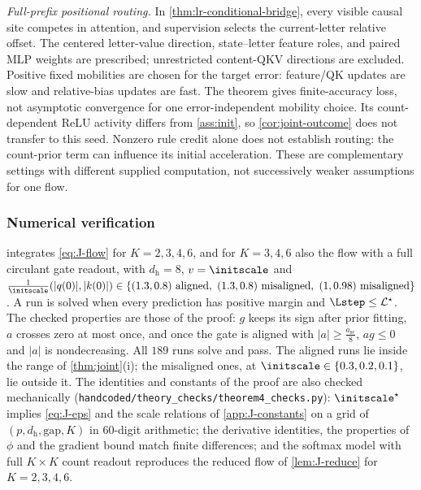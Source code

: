 \begin{remark}
\emph{Full-prefix positional routing.} In \cref{thm:lr-conditional-bridge}, every
visible causal site competes in attention, and supervision selects the current-letter
relative offset. The centered letter-value direction, state--letter feature roles,
and paired MLP weights are prescribed; unrestricted content-QKV directions are excluded. Positive fixed mobilities are chosen for the
target error: feature/QK updates are slow and relative-bias updates are fast.
The theorem gives finite-accuracy loss, not asymptotic convergence for one
error-independent mobility choice. Its count-dependent ReLU activity differs
from \cref{ass:init}, so \cref{cor:joint-outcome} does not transfer to this seed.
Nonzero rule credit alone does not establish routing: the count-prior term
can influence its initial acceleration. These are complementary settings with
different supplied computation, not successively weaker assumptions for one flow.

\end{remark}

\subsubsection{Numerical verification}
\label{app:J-generalK}

 integrates \cref{eq:J-flow} for $K=2,3,4,6$, and for $K=3,4,6$ also the flow with a full circulant gate readout, with
$d_{\mathrm h}=8$, $v=\initscale$ and $\frac{1}{\initscale}(|q(0)|,|k(0)|)\in\{(1.3,0.8)\text{ aligned},\ (1.3,0.8)\text{ misaligned},\ (1,0.98)\text{ misaligned}\}$. A run is solved when every
prediction has positive margin and $\Lstep\le \mathcal L^\star$. The checked properties are those of the proof: $g$ keeps its sign after prior
fitting, $a$ crosses zero at most once, and once the gate is aligned with $|a|\ge\frac{a_{\mathrm{sc}}}{8}$, $ag\le0$ and $|a|$ is nondecreasing. All $189$ runs
solve and pass. The aligned runs lie inside the range of \cref{thm:joint}(i); the misaligned ones, at $\initscale\in\{0.3,0.2,0.1\}$, lie outside it.
The identities and constants of the proof are also checked mechanically (\texttt{handcoded/theory\_checks/theorem4\_checks.py}): $\initscale^\star$
implies \cref{eq:J-eps} and the scale relations of \cref{app:J-constants} on a grid of $(p,d_{\mathrm h},\mathrm{gap},K)$ in $60$-digit arithmetic; the
derivative identities, the properties of $\phi$ and the gradient bound match finite differences; and the softmax model with full
$K\times K$ count readout reproduces the reduced flow of \cref{lem:J-reduce} for $K=2,3,4,6$.

